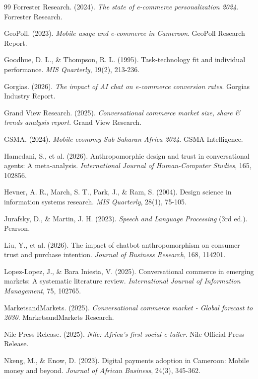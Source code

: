\documentclass[12pt,a4paper]{article}
\begin{document}
\begin{thebibliography}{99}
Forrester Research. (2024). \textit{The state of e-commerce personalization 2024}. Forrester Research.

GeoPoll. (2023). \textit{Mobile usage and e-commerce in Cameroon}. GeoPoll Research Report.

Goodhue, D. L., \& Thompson, R. L. (1995). Task-technology fit and individual performance. \textit{MIS Quarterly}, 19(2), 213-236.

Gorgias. (2026). \textit{The impact of AI chat on e-commerce conversion rates}. Gorgias Industry Report.

Grand View Research. (2025). \textit{Conversational commerce market size, share \& trends analysis report}. Grand View Research.

GSMA. (2024). \textit{Mobile economy Sub-Saharan Africa 2024}. GSMA Intelligence.

Hamedani, S., et al. (2026). Anthropomorphic design and trust in conversational agents: A meta-analysis. \textit{International Journal of Human-Computer Studies}, 165, 102856.

Hevner, A. R., March, S. T., Park, J., \& Ram, S. (2004). Design science in information systems research. \textit{MIS Quarterly}, 28(1), 75-105.

Jurafsky, D., \& Martin, J. H. (2023). \textit{Speech and Language Processing} (3rd ed.). Pearson.

Liu, Y., et al. (2026). The impact of chatbot anthropomorphism on consumer trust and purchase intention. \textit{Journal of Business Research}, 168, 114201.

Lopez-Lopez, J., \& Bara Iniesta, V. (2025). Conversational commerce in emerging markets: A systematic literature review. \textit{International Journal of Information Management}, 75, 102765.

MarketsandMarkets. (2025). \textit{Conversational commerce market - Global forecast to 2030}. MarketsandMarkets Research.

Nile Press Release. (2025). \textit{Nile: Africa's first social e-tailer}. Nile Official Press Release.

Nkeng, M., \& Enow, D. (2023). Digital payments adoption in Cameroon: Mobile money and beyond. \textit{Journal of African Business}, 24(3), 345-362.


\end{thebibliography}
\end{document}
